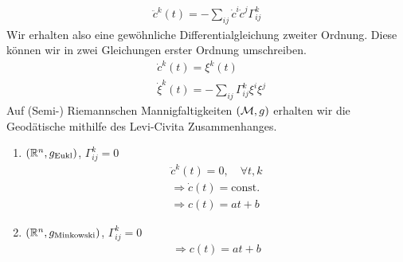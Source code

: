 
\begin{align}
\ddot{c}^k (t) = - \sum_{ij} \dot{c}^i \dot{c}^j \Gamma^k_{ij}
\end{align}
Wir erhalten also eine gewöhnliche Differentialgleichung zweiter Ordnung.
Diese können wir in zwei Gleichungen erster Ordnung umschreiben.
\begin{align}
&\dot{c}^k (t) = \xi^k(t)\\
&\dot{\xi}^k (t) = - \sum_{ij} \Gamma^k_{ij} \xi^i \xi^j
\end{align}
Auf (Semi-) Riemannschen Mannigfaltigkeiten $(\mathcal{M}, g)$ erhalten wir die Geodätische mithilfe des Levi-Civita Zusammenhanges.

\begin{bsp}
\begin{enumerate}
\item $(\mathbb{R}^n, g_{\text{Eukl}})$, $\Gamma^k_{ij}= 0$
\begin{align*}
\ddot{c}^k(t) = 0, \quad \forall t, k\\
\Rightarrow \dot{c}(t) = \text{const.}\\
\Rightarrow c(t) = a t + b
\end{align*}
\item $(\mathbb{R}^n, g_{\text{Minkowski}})$, $\Gamma^k_{ij}= 0$
\begin{align*}
\Rightarrow c(t) = a t + b
\end{align*}
\end{enumerate}
\end{bsp} 

